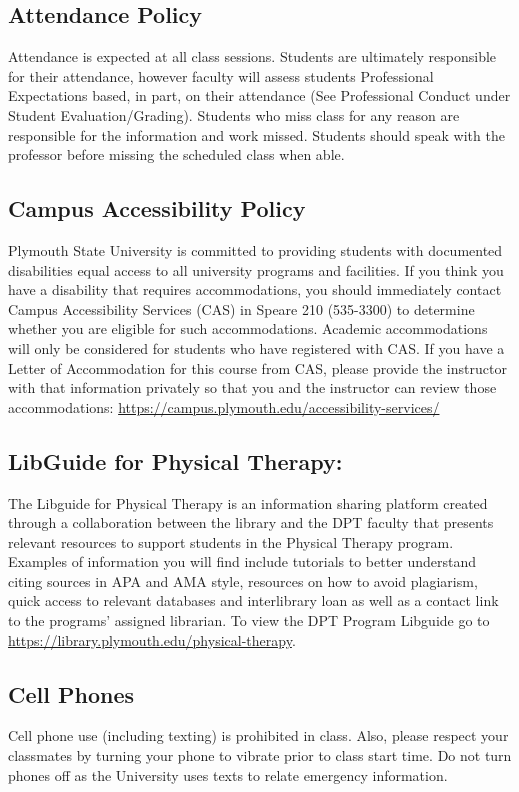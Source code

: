 \documentclass[letterpaper]{inzane_syllabus} %
\begin{document}
\subsection{Attendance Policy}
\footnotesize{Attendance is expected at all class sessions. Students are ultimately responsible for their attendance, however faculty will assess students Professional Expectations based, in part, on their attendance (See Professional Conduct under Student Evaluation/Grading).  Students who miss class for any reason are responsible for the information and work missed. Students should speak with the professor before missing the scheduled class when able.}


\subsection{Campus Accessibility Policy}
\footnotesize{Plymouth State University is committed to providing students with documented disabilities equal access to all university programs and facilities. If you think you have a disability that requires accommodations, you should immediately contact Campus Accessibility Services (CAS) in Speare 210 (535-3300) to determine whether you are eligible for such accommodations. Academic accommodations will only be considered for students who have registered with CAS. If you have a Letter of Accommodation for this course from CAS, please provide the instructor with that information privately so that you and the instructor can review those accommodations: \url{https://campus.plymouth.edu/accessibility-services/}}

\subsection{LibGuide for Physical Therapy:}
\footnotesize{The Libguide for Physical Therapy is an information sharing platform created through a collaboration between the library and the DPT faculty that presents relevant resources to support students in the Physical Therapy program. Examples of information you will find include tutorials to better understand citing sources in APA and AMA style, resources on how to avoid plagiarism, quick access to relevant databases and interlibrary loan as well as a contact link to the programs’ assigned librarian. To view the DPT Program Libguide go to \url{https://library.plymouth.edu/physical-therapy}.}

\vspace{0.5cm}
\subsection{Cell Phones}
Cell phone use (including texting) is prohibited in class. Also, please respect your classmates by turning your phone to vibrate prior to class start time. Do not turn phones off as the University uses texts to relate emergency information.  
\end{document}

